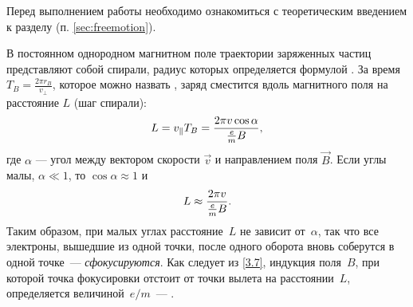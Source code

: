 


Перед выполнением работы необходимо ознакомиться с теоретическим введением
к разделу (п. \ref{sec:freemotion}).


В постоянном однородном магнитном поле траектории заряженных частиц представляют
собой спирали, радиус которых определяется формулой .
За время $T_B= \frac{2\pi r_B}{v_{\perp}}$, которое можно назвать
\mbox{}, заряд сместится вдоль магнитного поля на 
расстояние $L$ (шаг спирали):
\begin{equation}
    \eqmark{3.6}
    L = v_{\parallel}T_B =\frac{2\pi v\cos\alpha}{\frac{e}{m}B},
\end{equation}
где $\alpha$ --- угол между вектором скорости $\vec{v}$ и направлением поля $\vec{B}$.
Если углы малы, $\alpha \ll 1$, то $\cos\alpha \approx 1$ и
\begin{equation}
    \eqmark{3.7}
    L \approx \frac{2\pi v}{\frac{e}{m}B}.
\end{equation}
Таким образом, при малых углах расстояние~$L$ не зависит от~$\alpha$, так
что все электроны, вышедшие из одной точки, после одного оборота вновь соберутся
в одной точке~--- \emph{сфокусируются}. Как следует из \eqref{3.7}, 
индукция поля~$B$, при которой точка фокусировки отстоит от точки вылета 
на расстоянии~$L$, определяется величиной~$e/m$~--- 
.

%

